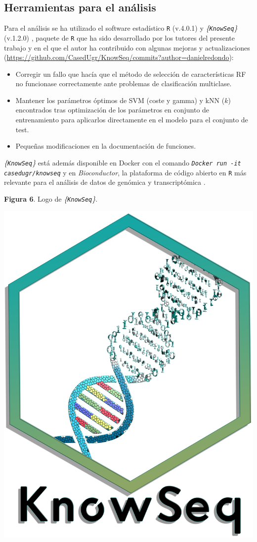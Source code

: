 \subsection{Herramientas para el análisis}

Para el análisis se ha utilizado el software estadístico \texttt{R} (v.4.0.1) \cite{R} y \textit{\{\texttt{KnowSeq}\}} (v.1.2.0) \cite{KnowSeq}, paquete de \texttt{R} que ha sido desarrollado por los tutores del presente trabajo y en el que el autor ha contribuido con algunas mejoras y actualizaciones (\url{https://github.com/CasedUgr/KnowSeq/commits?author=danielredondo}):

\begin{itemize}
	\item Corregir un fallo que hacía que el método de selección de características RF no funcionase correctamente ante problemas de clasificación multiclase.
	\item Mantener los parámetros óptimos de SVM (coste y gamma) y kNN ($k$) encontrados tras optimización de los parámetros en conjunto de entrenamiento para aplicarlos directamente en el modelo para el conjunto de test.
	\item Pequeñas modificaciones en la documentación de funciones.
\end{itemize}

\textit{\{\texttt{KnowSeq}\}} está además disponible en Docker con el comando \textit{\texttt{Docker run -it casedugr/knowseq}} y en \textit{Bioconductor}, la plataforma de código abierto en \texttt{R} más relevante para el análisis de datos de genómica y transcriptómica \cite{Gentleman2004}.\\

\newpage
\begin{center}
\textbf{Figura 6}. Logo de \textit{\{\texttt{KnowSeq}\}}.
\end{center}
\begin{center}
	\includegraphics[width=.3\textwidth]{figuras/06_logo_knowseq.png} 
\end{center}

